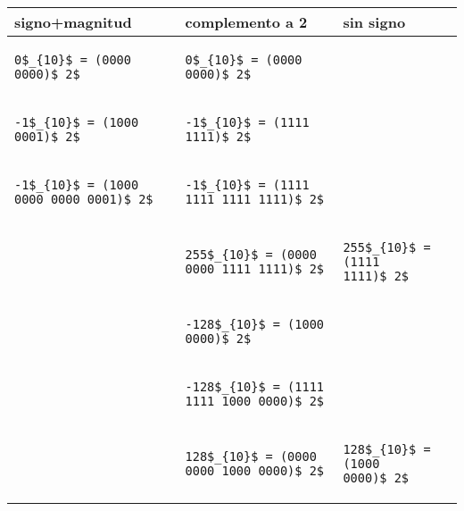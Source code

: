 \begin{tabular}{l|l|l}
signo+magnitud & complemento a 2 & sin signo \\
\hline

\begin{lstlisting}
0$_{10}$ = (0000 0000)$_2$
\end{lstlisting}
&
\begin{lstlisting}
0$_{10}$ = (0000 0000)$_2$
\end{lstlisting}
&
\\

\begin{lstlisting}
-1$_{10}$ = (1000 0001)$_2$
\end{lstlisting}
&
\begin{lstlisting}
-1$_{10}$ = (1111 1111)$_2$
\end{lstlisting}
&
\\

\begin{lstlisting}
-1$_{10}$ = (1000 0000 0000 0001)$_2$
\end{lstlisting}
&
\begin{lstlisting}
-1$_{10}$ = (1111 1111 1111 1111)$_2$
\end{lstlisting}
&
\\

&
\begin{lstlisting}
255$_{10}$ = (0000 0000 1111 1111)$_2$
\end{lstlisting}
&
\begin{lstlisting}
255$_{10}$ = (1111 1111)$_2$
\end{lstlisting}
\\

&
\begin{lstlisting}
-128$_{10}$ = (1000 0000)$_2$
\end{lstlisting}
&
\\

&
\begin{lstlisting}
-128$_{10}$ = (1111 1111 1000 0000)$_2$
\end{lstlisting}
&
\\

&
\begin{lstlisting}
128$_{10}$ = (0000 0000 1000 0000)$_2$
\end{lstlisting}
&
\begin{lstlisting}
128$_{10}$ = (1000 0000)$_2$
\end{lstlisting}
\\

\end{tabular}

